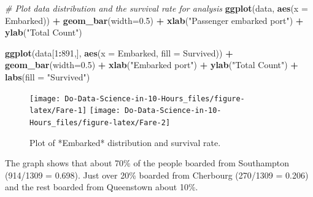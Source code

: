 \documentclass[
]{book}
\newenvironment{Shaded}{\begin{snugshade}}{\end{snugshade}}
\newcommand{\CommentTok}[1]{\textcolor[rgb]{0.56,0.35,0.01}{\textit{#1}}}
\newcommand{\DataTypeTok}[1]{\textcolor[rgb]{0.13,0.29,0.53}{#1}}
\newcommand{\DecValTok}[1]{\textcolor[rgb]{0.00,0.00,0.81}{#1}}
\newcommand{\FloatTok}[1]{\textcolor[rgb]{0.00,0.00,0.81}{#1}}
\newcommand{\KeywordTok}[1]{\textcolor[rgb]{0.13,0.29,0.53}{\textbf{#1}}}
\newcommand{\NormalTok}[1]{#1}
\newcommand{\OperatorTok}[1]{\textcolor[rgb]{0.81,0.36,0.00}{\textbf{#1}}}
\newcommand{\StringTok}[1]{\textcolor[rgb]{0.31,0.60,0.02}{#1}}
\begin{document}
\begin{Shaded}
\begin{Highlighting}[]
\CommentTok{# Plot data distribution and the survival rate for analysis}
\KeywordTok{ggplot}\NormalTok{(data, }\KeywordTok{aes}\NormalTok{(}\DataTypeTok{x =}\NormalTok{ Embarked)) }\OperatorTok{+}
\StringTok{  }\KeywordTok{geom_bar}\NormalTok{(}\DataTypeTok{width=}\FloatTok{0.5}\NormalTok{) }\OperatorTok{+}
\StringTok{  }\KeywordTok{xlab}\NormalTok{(}\StringTok{"Passenger embarked port"}\NormalTok{) }\OperatorTok{+}
\StringTok{  }\KeywordTok{ylab}\NormalTok{(}\StringTok{"Total Count"}\NormalTok{) }


\KeywordTok{ggplot}\NormalTok{(data[}\DecValTok{1}\OperatorTok{:}\DecValTok{891}\NormalTok{,], }\KeywordTok{aes}\NormalTok{(}\DataTypeTok{x =}\NormalTok{ Embarked, }\DataTypeTok{fill =}\NormalTok{ Survived)) }\OperatorTok{+}
\StringTok{  }\KeywordTok{geom_bar}\NormalTok{(}\DataTypeTok{width=}\FloatTok{0.5}\NormalTok{) }\OperatorTok{+}
\StringTok{   }\KeywordTok{xlab}\NormalTok{(}\StringTok{"Embarked port"}\NormalTok{) }\OperatorTok{+}
\StringTok{  }\KeywordTok{ylab}\NormalTok{(}\StringTok{"Total Count"}\NormalTok{) }\OperatorTok{+}
\StringTok{  }\KeywordTok{labs}\NormalTok{(}\DataTypeTok{fill =} \StringTok{"Survived"}\NormalTok{)}
\end{Highlighting}
\end{Shaded}

\begin{figure}

{\centering \texttt{[image: Do-Data-Science-in-10-Hours\_files/figure-latex/Fare-1]} \texttt{[image: Do-Data-Science-in-10-Hours\_files/figure-latex/Fare-2]} 

}

\caption{Plot of *Embarked* distribution and survival rate.}\label{fig:Fare}
\end{figure}

The graph shows that about 70\% of the people boarded from Southampton (914/1309 = 0.698). Just over 20\% boarded from Cherbourg (270/1309 = 0.206) and the rest boarded from Queenstown about 10\%.
\end{document}
